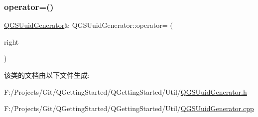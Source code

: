 \mbox{\label{class_q_g_s_uuid_generator_a3fc83cbe69e9a182caa4d447ae293c78}} 
\subsubsection{\texorpdfstring{operator=()}{operator=()}\hspace{0.1cm}{\footnotesize\ttfamily [2/2]}}
{\footnotesize\ttfamily \mbox{\hyperlink{class_q_g_s_uuid_generator}{Q\+G\+S\+Uuid\+Generator}}\& Q\+G\+S\+Uuid\+Generator\+::operator= (\begin{DoxyParamCaption}\item[{\mbox{\hyperlink{class_q_g_s_uuid_generator}{Q\+G\+S\+Uuid\+Generator}} \&\&}]{right }\end{DoxyParamCaption})\hspace{0.3cm}{\ttfamily [delete]}}



该类的文档由以下文件生成\+:\begin{DoxyCompactItemize}
\item 
F\+:/\+Projects/\+Git/\+Q\+Getting\+Started/\+Q\+Getting\+Started/\+Util/\mbox{\hyperlink{_q_g_s_uuid_generator_8h}{Q\+G\+S\+Uuid\+Generator.\+h}}\item 
F\+:/\+Projects/\+Git/\+Q\+Getting\+Started/\+Q\+Getting\+Started/\+Util/\mbox{\hyperlink{_q_g_s_uuid_generator_8cpp}{Q\+G\+S\+Uuid\+Generator.\+cpp}}\end{DoxyCompactItemize}
